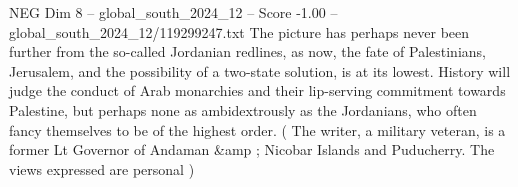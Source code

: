 \begin{textsample}{NEG Dim 8 – global\_south\_2024\_12 – Score -1.00 – global\_south\_2024\_12/119299247.txt}
The picture has perhaps never been further from the so-called Jordanian redlines, as now, the fate of Palestinians, Jerusalem, and the possibility of a two-state solution, is at its lowest.
History will judge the conduct of Arab monarchies and their lip-serving commitment towards Palestine, but perhaps none as ambidextrously as the Jordanians, who often fancy themselves to be of the highest order. ( The writer, a military veteran, is a former Lt Governor of Andaman \&amp ; Nicobar Islands and Puducherry.
The views expressed are personal )

\end{textsample}
